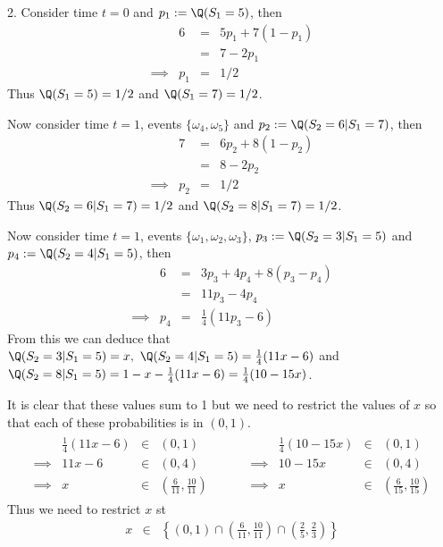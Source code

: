 \documentclass[11pt,a4paper]{article}
\begin{document}
\begin{answer}{2.}
  Consider time $t=0$ and $p_1:=\Q(S_1=5)$, then
  \[\begin{array}{rrcl}
    &6&=&5p_1+7(1-p_1)\\
    &&=&7-2p_1\\
    \implies&p_1&=&1/2
  \end{array}\]
  Thus $\Q(S_1=5)=1/2$ and $\Q(S_1=7)=1/2$.
  \par Now consider time $t=1$, events $\{\omega_4,\omega_5\}$ and $p_2:=\Q(S_2=6|S_1=7)$, then
  \[\begin{array}{rrcl}
    &7&=&6p_2+8(1-p_2)\\
    &&=&8-2p_2\\
    \implies&p_2&=&1/2
  \end{array}\]
  Thus $\Q(S_2=6|S_1=7)=1/2$ and $\Q(S_2=8|S_1=7)=1/2$.
  \par Now consider time $t=1$, events $\{\omega_1,\omega_2,\omega_3\}$, $p_3:=\Q(S_2=3|S_1=5)$ and ${p_4:=\Q(S_2=4|S_1=5)}$, then
  \[\begin{array}{rrcl}
    &6&=&3p_3+4p_4+8(p_3-p_4)\\
    &&=&11p_3-4p_4\\
    \implies&p_4&=&\frac14(11p_3-6)
  \end{array}\]
  From this we can deduce that $\Q(S_2=3|S_1=5)=x,\ \Q(S_2=4|S_1=5)=\frac14(11x-6)$ and $\Q(S_2=8|S_1=5)=1-x-\frac14(11x-6)=\frac14(10-15x)$.
  \par It is clear that these values sum to 1 but we need to restrict the values of $x$ so that each of these probabilities is in $(0,1)$.
  \[\begin{array}{ccc}
    \begin{array}{rrcl}
      &\frac14(11x-6)&\in&(0,1)\\
      \implies&11x-6&\in&(0,4)\\
      \implies&x&\in&\left(\frac6{11},\frac{10}{11}\right)
    \end{array}
    &\quad&
    \begin{array}{rrcl}
    &\frac14(10-15x)&\in&(0,1)\\
    \implies&10-15x&\in&(0,4)\\
    \implies&x&\in&\left(\frac6{15},\frac{10}{15}\right)
    \end{array}
  \end{array}\]
  Thus we need to restrict $x$ st
  \[\begin{array}{rcl}
    x&\in&\left\{(0,1)\cap\left(\frac6{11},\frac{10}{11}\right)\cap\left(\frac25,\frac23\right)\right\}\\

\end{array}\]
\end{answer}
\end{document}
